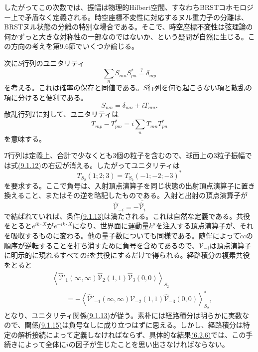 したがってこの次数では、振幅は物理的Hilbert空間、すなわちBRSTコホモロジー上で矛盾なく定義される。時空座標不変性に対応するヌル重力子の分離は、BRSTヌル状態の分離の特別な場合である。そこで、時空座標不変性は弦理論の何かずっと大きな対称性の一部なのではないか、という疑問が自然に生じる。この方向の考えを第9.6節でいくつか論じる。

次に$S$行列のユニタリティ
\begin{equation}
 \sum_n S_{mn}S_{pn}^*\overset{?}{=}\delta_{mp}
 \tag{9.1.10}\label{eq:9.1.10}
\end{equation}
を考える。これは確率の保存と同値である。$S$行列を何も起こらない項と散乱の項に分けると便利である。
\begin{equation}
 S_{mn}=\delta_{mn}+iT_{mn}.
 \tag{9.1.11}\label{eq:9.1.11}
\end{equation}
散乱行列$T$に対して、ユニタリティは
\begin{equation}
 T_{mp}-T_{pm}^*=i\sum_n T_{mn}T_{pn}^*
 \tag{9.1.12}\label{eq:9.1.12}
\end{equation}
を意味する。

$T$行列は定義上、合計で少なくとも3個の粒子を含むので、球面上の3粒子振幅では式\hyperref[eq:9.1.12]{(9.1.12)}の右辺が消える。したがってユニタリティは
\begin{equation}
 T_{S_2}(1;2;3)=T_{S_2}(-1;-2;-3)^*
 \tag{9.1.13}\label{eq:9.1.13}
\end{equation}
を要求する。ここで負号は、入射頂点演算子を同じ状態の出射頂点演算子に置き換えること、またはその逆を略記したものである。入射と出射の頂点演算子が
\begin{equation}
 \widehat{\mathcal V}_{-i}=-\overline{\widehat{\mathcal V}_i}
 \tag{9.1.14}\label{eq:9.1.14}
\end{equation}
で結ばれていれば、条件\hyperref[eq:9.1.13]{(9.1.13)}は満たされる。これは自然な定義である。共役をとると$e^{ik\cdot X}$が$e^{-ik\cdot X}$になり、世界面に運動量$k^\mu$を注入する頂点演算子が、それを吸収するものに変わる。他の量子数についても同様である。随伴によって$\tilde c c$の順序が逆転することを打ち消すために負号を含めてあるので、$\widehat{\mathcal V}_{-i}$は頂点演算子に明示的に現れるすべての$i$を共役にするだけで得られる。経路積分の複素共役をとると
\begin{equation}
 \begin{aligned}
 &\left\langle\widehat{\mathcal V}'_1(\infty,\infty)
 \widehat{\mathcal V}_2(1,1)\widehat{\mathcal V}_3(0,0)\right\rangle_{S_2}\\
 &\qquad=-\left\langle\widehat{\mathcal V}'_{-1}(\infty,\infty)
 \widehat{\mathcal V}_{-2}(1,1)\widehat{\mathcal V}_{-3}(0,0)\right\rangle_{S_2}^{*},
 \end{aligned}
 \tag{9.1.15}\label{eq:9.1.15}
\end{equation}
となり、ユニタリティ関係\hyperref[eq:9.1.13]{(9.1.13)}が従う。素朴には経路積分は明らかに実数なので、関係\hyperref[eq:9.1.15]{(9.1.15)}は負号なしに成り立つはずに思える。しかし、経路積分は特定の解析接続によって定義しなければならず、具体的な結果\hyperref[eq:6.2.6]{(6.2.6)}では、この手続きによって全体に$i$の因子が生じたことを思い出さなければならない。


